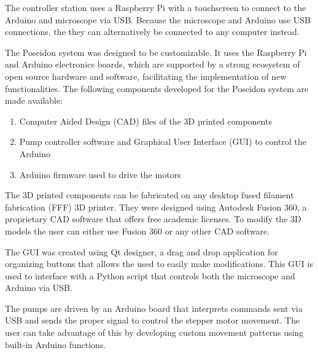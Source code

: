 \documentclass[10pt]{article} %
\begin{document}
\begin{minipage}[t]{.66\linewidth}
The controller station uses a Raspberry Pi with a touchscreen to connect to the Arduino and microscope via USB. Because the microscope and Arduino use USB connections, the they can alternatively be connected to any computer instead.  
		

	
		
		
		\hypertarget{secondnews}{} %
		
		The Poseidon system was designed to be customizable. It uses the Raspberry Pi and Arduino electronics boards, which are supported by a strong ecosystem of open source hardware and software, facilitating the implementation of new functionalities. The following components developed for the Poseidon system are made available:
		\begin{enumerate}
			\item Computer Aided Design (CAD) files of the 3D printed components
			\item Pump controller software and Graphical User Interface (GUI) to control the Arduino
			 \item Arduino firmware used to drive the motors
		\end{enumerate}

		
		The 3D printed components can be fabricated on any desktop fused filament fabrication (FFF) 3D printer. They were designed using Autodesk Fusion 360, a proprietary CAD software that offers free academic licenses. To modify the 3D models the user can either use Fusion 360 or any other CAD software.
		
		The GUI was created using Qt designer, a drag and drop application for organizing buttons that allows the used to easily make modifications. This GUI is used to interface with a Python script that controls both the microscope and Arduino via USB. 
		
		The pumps are driven by an Arduino board that interprets commands sent via USB and sends the proper signal to control the stepper motor movement. The user can take advantage of this by developing custom movement patterns using built-in Arduino functions.
		
	\end{minipage} %
	
	
\end{document}
